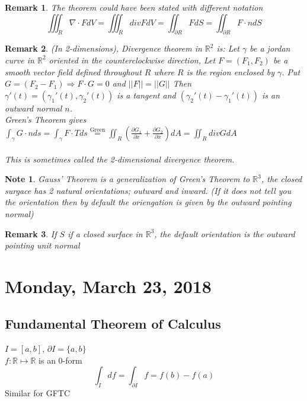 \documentclass[12pt]{article}
\theoremstyle{plain}
\newtheorem*{remark}{Remark}
\newtheorem*{note}{Note}
\theoremstyle{definition}
\begin{document}
\begin{remark}
	The theorem could have been stated with different notation
	$$\iiint_R \nabla \cdot F dV = \iiint_R div F dV = \iint_{\partial R} F dS = \iint_{\partial R} F\cdot n dS$$
\end{remark}

\begin{remark}
	(In 2-dimensions), Divergence theorem in $\mathbb{R}^2$ is: Let $\gamma$ be a jordan curve in $\mathbb{R}^2$ oriented in the counterclockwise direction, Let $F = (F_1, F_2)$ be a smooth vector field defined throughout $R$ where $R$ is the region enclosed by $\gamma$. Put $G=(F_2 -F_1) \Longrightarrow F \cdot G = 0$ and $||F||=||G||$ Then $\gamma '(t) = (\gamma_1 '(t), \gamma_2 '(t))$ is a tangent and $(\gamma_2 '(t)-\gamma_1 '(t))$ is an outward normal $n$.\\
	Green's Theorem gives $\int_\gamma G \cdot n ds = \int_\gamma F \cdot T ds \overset{\text{Green}}{=} \iint_R (\frac{\partial G_1}{\partial x} + \frac{\partial G_2}{\partial x})dA = \iint_R div G dA$\\
	\\
	This is sometimes called the 2-dimensional divergence theorem.
\end{remark}

\begin{note}
	Gauss' Theorem is a generalization of Green's Theorem to $\mathbb{R}^3$, the closed surgace has 2 natural orientations; outward and inward. (If it does not tell you the orientation then by default the oriengation is given by the outward pointing normal)
\end{note}

\begin{remark}
	If $S$ if a closed surface in $\mathbb{R}^3$, the default orientation is the outward pointing unit normal
\end{remark}

\newpage

\section{Monday, March 23, 2018}

\subsection{Fundamental Theorem of Calculus}

$I = [a,b]$, $\partial I = \{ a,b \}$\\
$f:\mathbb{R}\mapsto\mathbb{R}$ is an 0-form\\
$$\int_I df = \int_{\partial I} f = f(b) - f(a)$$
Similar for GFTC
\end{document}
